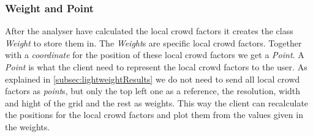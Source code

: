 \subsubsection{Weight and Point}
After the analyser have calculated the local crowd factors it creates the class \emph{Weight} to store them in. The \emph{Weight}s are specific local crowd factors. Together with a \emph{coordinate} for the position of these local crowd factors we get a \emph{Point}. A \emph{Point} is what the client need to represent the local crowd factors to the user. As explained in \cref{subsec:lightweightResults} we do not need to send all local crowd factors as \emph{point}s, but only the top left one as a reference, the resolution, width and hight of the grid and the rest as weights. This way the client can recalculate the positions for the local crowd factors and plot them from the values given in the weights.


